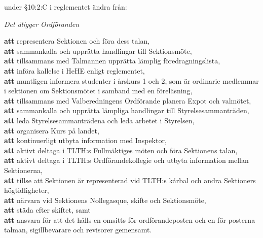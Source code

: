 \documentclass[../_main/handlingar.tex]{subfiles}
\begin{document}
\begin{attsatser}
    \newpage

    \att under \S10:2:C i reglementet ändra från:\par
    {\it
    Det åligger Ordföranden\par
    \textbf{att} representera Sektionen och föra dess talan,\\
    \textbf{att} sammankalla och upprätta handlingar till Sektionsmöte,\\
    \textbf{att} tillsammans med Talmannen upprätta lämplig föredragningslista,\\
    \textbf{att} införa kallelse i HeHE enligt reglementet,\\
    \textbf{att} muntligen informera studenter i årskurs 1 och 2, som är ordinarie medlemmar i sektionen om Sektionsmötet i samband med en föreläsning,\\
    \textbf{att} tillsammans med Valberedningens Ordförande planera Expot och valmötet,\\
    \textbf{att} sammankalla och upprätta lämpliga handlingar till Styrelsesammanträden,\\
    \textbf{att} leda Styrelsesammanträdena och leda arbetet i Styrelsen,\\
    \textbf{att} organisera Kurs på landet,\\
    \textbf{att} kontinuerligt utbyta information med Inspektor,\\
    \textbf{att} aktivt deltaga i TLTH:s Fullmäktiges möten och föra Sektionens talan,\\
    \textbf{att} aktivt deltaga i TLTH:s Ordförandekollegie och utbyta information mellan Sektionerna,\\
    \textbf{att} tillse att Sektionen är representerad vid TLTH:s kårbal och andra Sektioners högtidligheter,\\
    \textbf{att} närvara vid Sektionens Nollegasque, skifte och Sektionsmöte,\\
    \textbf{att} städa efter skiftet, samt\\
    \textbf{att} ansvara för att det hålls en omsitts för ordförandeposten och en för posterna talman, sigillbevarare och revisorer gemensamt.
    }


\end{attsatser}
\end{document}
